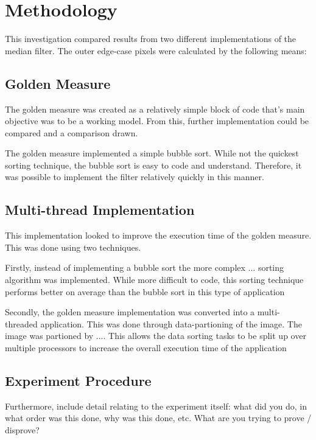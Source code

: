 \section{Methodology}
This investigation compared results from two different implementations of the median filter. The outer edge-case pixels were calculated by the following means:

\subsection{Golden Measure}
The golden measure was created as a relatively simple block of code that's main objective was to be a working model. From this, further implementation could be compared and a comparison drawn.

The golden measure implemented a simple bubble sort. While not the quickest sorting technique, the bubble sort is easy to code and understand. Therefore, it was possible to implement the filter relatively quickly in this manner.

\subsection{Multi-thread Implementation}
This implementation looked to improve the execution time of the golden measure. This was done using two techniques. 

Firstly, instead of implementing a bubble sort the more complex ... sorting algorithm was implemented. While more difficult to code, this sorting technique performs better on average than the bubble sort in this type of application

Secondly, the golden measure implementation was converted into a multi-threaded application. This was done through data-partioning of the image. The image was partioned by .... This allows the data sorting tasks to be split up over multiple processors to increase the overall execution time of the application

  
\subsection{Experiment Procedure}
Furthermore, include detail relating to the experiment itself: what did you do, in what order was this done, why was this done, etc.  What are you trying to prove / disprove?